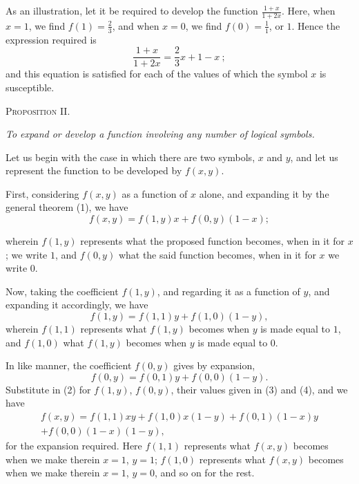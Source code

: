 \documentclass[oneside]{book}
\begin{document}
As an illustration, let it be required to develop the function $\frac{1+x}{1+2x}$. Here, when $x=1$, we find $f\left(1\right) = \frac{2}{3}$, and when $x = 0$,
we find $f\left(0\right) = \frac{1}{1}$, or $1$. Hence the expression required is
\[
\frac{1+x}{1+2x} = \frac{2}{3}x + 1 - x ~;
\]
and this equation is satisfied for each of the values of which the
symbol $x$ is susceptible.

\begin{center}
\textsc{Proposition II.}
\end{center}

\textit{To expand or develop a function involving any number of logical
symbols.}

Let us begin with the case in which there are two symbols,
$x$ and $y$, and let us represent the function to be developed by
$f\left(x, y\right)$.

First, considering $f\left(x, y\right)$ as a function of $x$ alone, and expanding
it by the general theorem (1), we have
\setcounter{equation}{1}
\begin{equation}
f\left(x,y\right) = f\left(1,y\right)x + f\left(0,y\right)\left(1-x\right);
\end{equation}

wherein $f\left(1, y\right)$ represents what the proposed function becomes,
when in it for $x$; we write $1$, and $f\left(0,y\right)$ what the said function
becomes, when in it for $x$ we write $0$.

Now, taking the coefficient $f\left(1, y\right)$, and regarding it as a function
of $y$, and expanding it accordingly, we have
\begin{equation}
f\left(1, y\right) = f\left(1, 1\right)y + f\left(1, 0\right)\left(1 - y\right),
\end{equation}
wherein $f\left(1, 1\right)$ represents what $f\left(1, y\right)$ becomes when $y$ is made
equal to $1$, and $f\left(1, 0\right)$ what $f\left(1, y\right)$ becomes when $y$ is made
equal to $0$.

In like manner, the coefficient $f\left(0, y\right)$ gives by expansion,
\begin{equation}
f\left(0, y\right) = f\left(0, 1\right)y + f\left(0, 0\right)\left(1 - y\right).
\end{equation}
Substitute in (2) for $f\left(1, y\right)$, $f\left(0, y\right)$, their values given in (3)
and (4), and we have
\begin{eqnarray}
f\left(x, y\right) = f\left(1, 1\right)xy
                   + f\left(1, 0\right)x\left(1 - y \right)
                   + f\left(0, 1\right)\left(1 - x \right)y\\
                   + f\left(0, 0\right)\left(1 - x \right)\left(1 - y \right),
\end{eqnarray}
for the expansion required. Here $f\left(1, 1\right)$ represents what $f\left(x, y\right)$
becomes when we make therein $x=1$, $y=1$; $f\left(1, 0\right)$ represents
what $f\left(x, y\right)$ becomes when we make therein $x=1$, $y=0$, and
so on for the rest.
\end{document}
